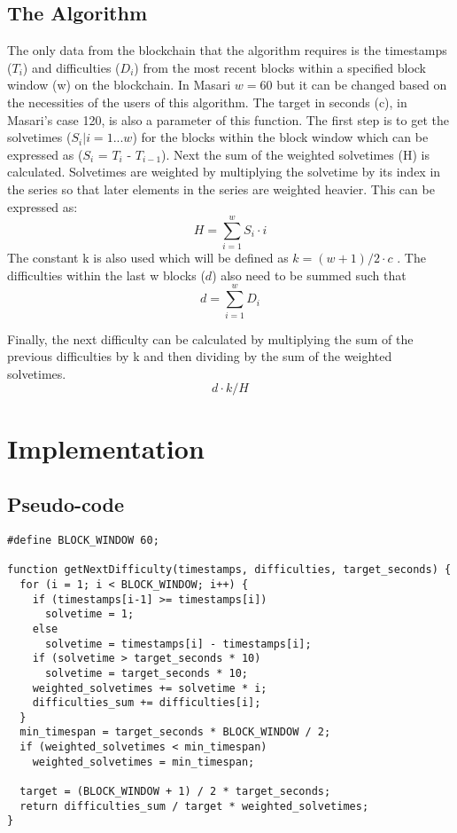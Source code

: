 \documentclass{article}
\begin{document}
\subsection{The Algorithm}
The only data
from the blockchain that the algorithm
requires is the timestamps ($T_{i}$) and
difficulties ($D_{i}$) from the most recent
blocks within a specified block window (w)
on the blockchain. In Masari $w = 60$ but it can be changed based on the necessities of the users of this algorithm. The target in seconds (c), in Masari's case 120, is also a parameter of this function. The first step is to get
the solvetimes ($S_{i} | i = 1 ... w$) for the blocks
within the block window which can be
expressed as ($S_{i}$ = $T_{i}$ - $T_{i-1}$). Next the sum of the weighted solvetimes (H) is calculated. Solvetimes are weighted by multiplying the solvetime by its index in the series so that later elements in the series are weighted heavier. This can be expressed as: 
$$H = \sum_{i=1}^{w} S_{i}\cdot i$$
The constant k is also used which will be defined as $k = (w+1)/2\cdot c$ .
The difficulties within the last w blocks ($d$) also need to be summed such that $$d = \sum_{i=1}^{w}D_i$$

Finally, the next difficulty can be calculated by multiplying the sum of the previous difficulties by k and then dividing by the sum of the weighted solvetimes.
 $$d\cdot k / H$$
 
\section{Implementation}
\subsection{Pseudo-code}
\lstset {language=C}
\begin{lstlisting}
#define BLOCK_WINDOW 60;

function getNextDifficulty(timestamps, difficulties, target_seconds) {
  for (i = 1; i < BLOCK_WINDOW; i++) {
    if (timestamps[i-1] >= timestamps[i])
      solvetime = 1;
    else
      solvetime = timestamps[i] - timestamps[i];
    if (solvetime > target_seconds * 10)
      solvetime = target_seconds * 10;
    weighted_solvetimes += solvetime * i;
    difficulties_sum += difficulties[i];
  }
  min_timespan = target_seconds * BLOCK_WINDOW / 2;
  if (weighted_solvetimes < min_timespan)
    weighted_solvetimes = min_timespan;
  
  target = (BLOCK_WINDOW + 1) / 2 * target_seconds;
  return difficulties_sum / target * weighted_solvetimes;
}

\end{lstlisting}
 
\end{document}
